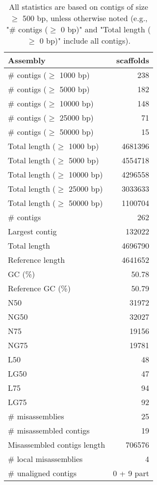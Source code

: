 \documentclass[12pt,a4paper]{article}
\begin{document}
\begin{table}[ht]
\begin{center}
\caption{All statistics are based on contigs of size $\geq$ 500 bp, unless otherwise noted (e.g., "\# contigs ($\geq$ 0 bp)" and "Total length ($\geq$ 0 bp)" include all contigs).}
\begin{tabular}{|l*{1}{|r}|}
\hline
Assembly & scaffolds \\ \hline
\# contigs ($\geq$ 1000 bp) & 238 \\ \hline
\# contigs ($\geq$ 5000 bp) & 182 \\ \hline
\# contigs ($\geq$ 10000 bp) & 148 \\ \hline
\# contigs ($\geq$ 25000 bp) & 71 \\ \hline
\# contigs ($\geq$ 50000 bp) & 15 \\ \hline
Total length ($\geq$ 1000 bp) & 4681396 \\ \hline
Total length ($\geq$ 5000 bp) & 4554718 \\ \hline
Total length ($\geq$ 10000 bp) & 4296558 \\ \hline
Total length ($\geq$ 25000 bp) & 3033633 \\ \hline
Total length ($\geq$ 50000 bp) & 1100704 \\ \hline
\# contigs & 262 \\ \hline
Largest contig & 132022 \\ \hline
Total length & 4696790 \\ \hline
Reference length & 4641652 \\ \hline
GC (\%) & 50.78 \\ \hline
Reference GC (\%) & 50.79 \\ \hline
N50 & 31972 \\ \hline
NG50 & 32027 \\ \hline
N75 & 19156 \\ \hline
NG75 & 19781 \\ \hline
L50 & 48 \\ \hline
LG50 & 47 \\ \hline
L75 & 94 \\ \hline
LG75 & 92 \\ \hline
\# misassemblies & 25 \\ \hline
\# misassembled contigs & 19 \\ \hline
Misassembled contigs length & 706576 \\ \hline
\# local misassemblies & 4 \\ \hline
\# unaligned contigs & 0 + 9 part \\ \hline

\end{tabular}
\end{center}
\end{table}
\end{document}
